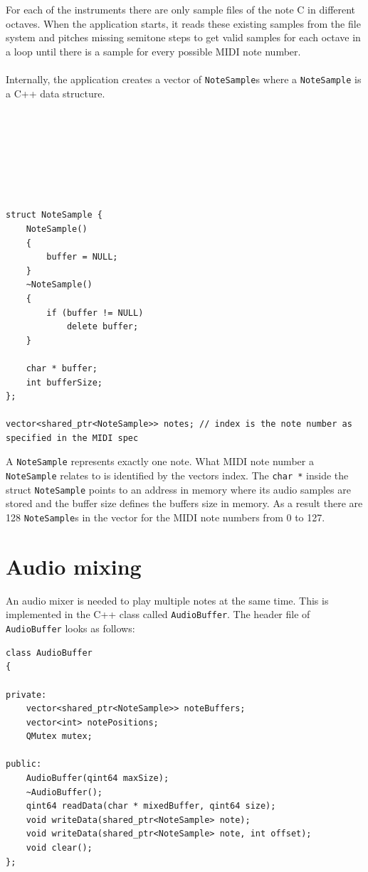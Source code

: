 For each of the instruments there are only sample files of the note C in different octaves. 
When the application starts, it reads these existing samples from the file system and 
pitches missing semitone steps to get valid samples for each octave in a loop until 
there is a sample for every possible MIDI note number.
\\ \\
Internally, the application creates a vector of {\tt NoteSample}s where a 
{\tt NoteSample} is a C++ data structure.
\\ \\ \\ \\ \\ \\ \\ \\ 
\begin{lstlisting}
struct NoteSample {
    NoteSample()
    {
        buffer = NULL;
    }
    ~NoteSample()
    {
        if (buffer != NULL)
            delete buffer;
    }

    char * buffer;
    int bufferSize;
};

vector<shared_ptr<NoteSample>> notes; // index is the note number as specified in the MIDI spec
\end{lstlisting}

A {\tt NoteSample} represents exactly one note. What MIDI note number a {\tt NoteSample} 
relates to is identified by the vectors index. The {\tt char *} inside the 
struct {\tt NoteSample} points to an address in memory where its audio samples are 
stored and the buffer size defines the buffers size in memory. As a result 
there are 128 {\tt NoteSample}s in the vector for the MIDI note numbers from 0 to 127.

\section{Audio mixing}

An audio mixer is needed to play multiple notes at the same time. 
This is implemented in the C++ class called {\tt AudioBuffer}. 
The header file of {\tt AudioBuffer} looks as follows:
\\
\begin{lstlisting}
class AudioBuffer
{

private:
    vector<shared_ptr<NoteSample>> noteBuffers;
    vector<int> notePositions;
    QMutex mutex;

public:
    AudioBuffer(qint64 maxSize);
    ~AudioBuffer();
    qint64 readData(char * mixedBuffer, qint64 size);
    void writeData(shared_ptr<NoteSample> note);
    void writeData(shared_ptr<NoteSample> note, int offset);
    void clear();
};
\end{lstlisting}

